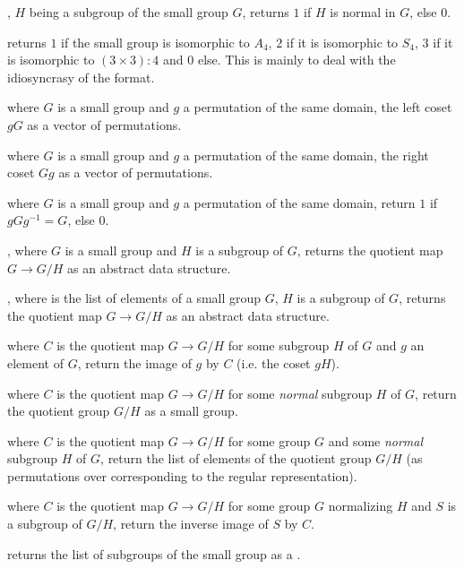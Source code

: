 , $H$ being a subgroup of the
small group $G$, returns $1$ if $H$ is normal in $G$, else $0$.

 returns $1$ if the small group
 is isomorphic to $A_4$, $2$ if it is isomorphic to $S_4$,
$3$ if it is isomorphic to $(3\times 3):4$ and
$0$ else. This is mainly to deal with the idiosyncrasy of the format.

 where $G$ is a small group and $g$ a
permutation of the same domain, the left coset $gG$ as a vector of
permutations.

 where $G$ is a small group and $g$ a
permutation of the same domain, the right coset $Gg$  as a vector of
permutations.

 where $G$ is a small group and
$g$ a permutation of the same domain, return $1$ if $gGg^{-1}=G$, else $0$.

, where $G$ is a small group and
$H$ is a subgroup of $G$, returns the quotient map $G\rightarrow G/H$
as an abstract data structure.

, where  is the list of
elements of a small group $G$, $H$ is a subgroup of $G$, returns the quotient
map $G\rightarrow G/H$ as an abstract data structure.

 where $C$ is the quotient map
$G\rightarrow G/H$ for some subgroup $H$ of $G$ and $g$ an element of $G$,
return the image of $g$ by $C$ (i.e. the coset $gH$).

 where $C$ is the quotient map
$G\rightarrow G/H$ for some \emph{normal} subgroup $H$ of $G$, return the
quotient group $G/H$ as a small group.

 where $C$ is the quotient map
$G\rightarrow G/H$ for some group $G$ and some \emph{normal} subgroup $H$ of $G$,
return the list of elements of the quotient group $G/H$ (as permutations over
corresponding to the regular representation).

 where $C$ is the
quotient map $G\rightarrow G/H$ for some group $G$ normalizing $H$ and $S$ is
a subgroup of $G/H$, return the inverse image of $S$ by $C$.

 returns the list of subgroups of the
small group  as a .

